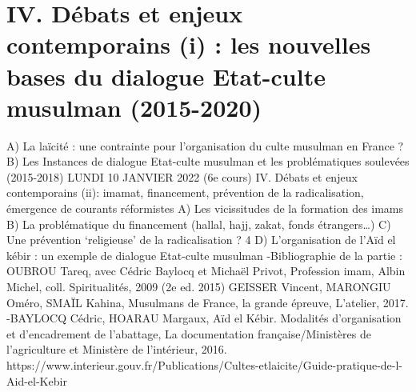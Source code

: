 \chapter{IV. Débats et enjeux contemporains (i) : les nouvelles bases du dialogue Etat-culte
musulman (2015-2020)}

A) La laïcité : une contrainte pour l’organisation du culte musulman en France ?
B) Les Instances de dialogue Etat-culte musulman et les problématiques
soulevées (2015-2018)
LUNDI 10 JANVIER 2022 (6e
cours)
IV. Débats et enjeux contemporains (ii): imamat, financement, prévention de la
radicalisation, émergence de courants réformistes
A) Les vicissitudes de la formation des imams
B) La problématique du financement (hallal, hajj, zakat, fonds étrangers…)
C) Une prévention ‘religieuse’ de la radicalisation ?
4
D) L’organisation de l’Aïd el kébir : un exemple de dialogue Etat-culte
musulman
-Bibliographie de la partie :
OUBROU Tareq, avec Cédric Baylocq et Michaël Privot, Profession imam, Albin
Michel, coll. Spiritualités, 2009 (2e
ed. 2015)
GEISSER Vincent, MARONGIU Oméro, SMAÏL Kahina, Musulmans de France, la
grande épreuve, L’atelier, 2017.
-BAYLOCQ Cédric, HOARAU Margaux, Aïd el Kébir. Modalités d’organisation et
d’encadrement de l’abattage, La documentation française/Ministères de l’agriculture et
Ministère de l’intérieur, 2016. https://www.interieur.gouv.fr/Publications/Cultes-etlaicite/Guide-pratique-de-l-Aid-el-Kebir